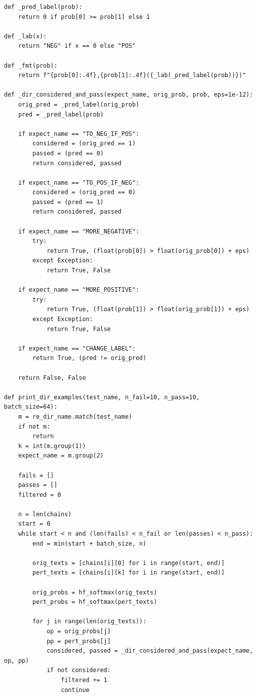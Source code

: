 \documentclass[11pt]{article}
\begin{document}
\begin{lstlisting}
def _pred_label(prob):
    return 0 if prob[0] >= prob[1] else 1

def _lab(x):
    return "NEG" if x == 0 else "POS"

def _fmt(prob):
    return f"{prob[0]:.4f},{prob[1]:.4f}({_lab(_pred_label(prob))})"

def _dir_considered_and_pass(expect_name, orig_prob, prob, eps=1e-12):
    orig_pred = _pred_label(orig_prob)
    pred = _pred_label(prob)

    if expect_name == "TO_NEG_IF_POS":
        considered = (orig_pred == 1)
        passed = (pred == 0)
        return considered, passed

    if expect_name == "TO_POS_IF_NEG":
        considered = (orig_pred == 0)
        passed = (pred == 1)
        return considered, passed

    if expect_name == "MORE_NEGATIVE":
        try:
            return True, (float(prob[0]) > float(orig_prob[0]) + eps)
        except Exception:
            return True, False

    if expect_name == "MORE_POSITIVE":
        try:
            return True, (float(prob[1]) > float(orig_prob[1]) + eps)
        except Exception:
            return True, False

    if expect_name == "CHANGE_LABEL":
        return True, (pred != orig_pred)

    return False, False

def print_dir_examples(test_name, n_fail=10, n_pass=10, batch_size=64):
    m = re_dir_name.match(test_name)
    if not m:
        return
    k = int(m.group(1))
    expect_name = m.group(2)

    fails = []
    passes = []
    filtered = 0

    n = len(chains)
    start = 0
    while start < n and (len(fails) < n_fail or len(passes) < n_pass):
        end = min(start + batch_size, n)

        orig_texts = [chains[i][0] for i in range(start, end)]
        pert_texts = [chains[i][k] for i in range(start, end)]

        orig_probs = hf_softmax(orig_texts)
        pert_probs = hf_softmax(pert_texts)

        for j in range(len(orig_texts)):
            op = orig_probs[j]
            pp = pert_probs[j]
            considered, passed = _dir_considered_and_pass(expect_name, op, pp)
            if not considered:
                filtered += 1
                continue


\end{lstlisting}
\end{document}
